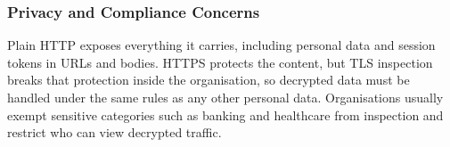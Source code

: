 \subsubsection{Privacy and Compliance Concerns}

Plain HTTP exposes everything it carries, including personal data and session tokens in URLs and bodies. HTTPS protects the content, but TLS inspection breaks that protection inside the organisation, so decrypted data must be handled under the same rules as any other personal data. Organisations usually exempt sensitive categories such as banking and healthcare from inspection and restrict who can view decrypted traffic.
